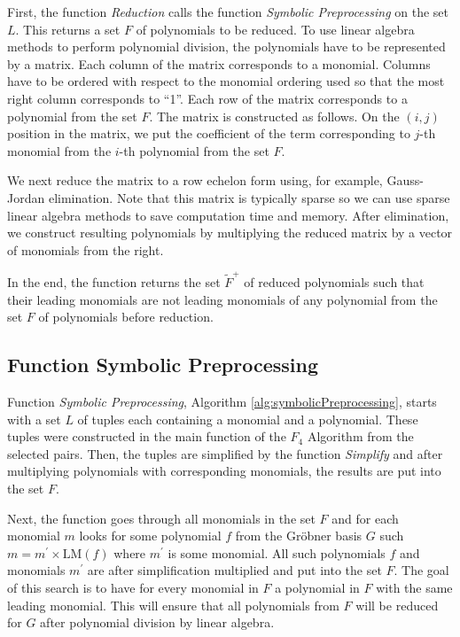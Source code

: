 First, the function \textit{Reduction} calls the function \textit{Symbolic Preprocessing} on the set $L$. This returns a set $F$ of polynomials to be reduced. To use linear algebra methods to perform polynomial division, the polynomials have to be represented by a matrix. Each column of the matrix corresponds to a monomial. Columns have to be ordered with respect to the monomial ordering used so that the most right column corresponds to ``1''. Each row of the matrix corresponds to a polynomial from the set $F$. The matrix is constructed as follows. On the $(i, j)$ position in the matrix, we put the coefficient of the term corresponding to $j$-th monomial from the $i$-th polynomial from the set $F$.

We next reduce the matrix to a row echelon form using, for example, Gauss-Jordan elimination. Note that this matrix is typically sparse so we can use sparse linear algebra methods to save computation time and memory. After elimination, we construct resulting polynomials by multiplying the reduced matrix by a vector of monomials from the right.

In the end, the function returns the set $\tilde{F}^+$ of reduced polynomials such that their leading monomials are not leading monomials of any polynomial from the set $F$ of polynomials before reduction.



\subsection{Function Symbolic Preprocessing}
Function \textit{Symbolic Preprocessing}, Algorithm \ref{alg:symbolicPreprocessing}, starts with a set $L$ of tuples each containing a monomial and a polynomial. These tuples were constructed in the main function of the $F_4$ Algorithm from the selected pairs. Then, the tuples are simplified by the function \textit{Simplify} and after multiplying polynomials with corresponding monomials, the results are put into the set $F$.

Next, the function goes through all monomials in the set $F$ and for each monomial $m$ looks for some polynomial $f$ from the Gr\"obner basis $G$ such $m = m^\prime \times \textrm{LM}(f)$ where $m^\prime$ is some monomial. All such polynomials $f$ and monomials $m^\prime$ are after simplification multiplied and put into the set $F$. The goal of this search is to have for every monomial in $F$ a polynomial in $F$ with the same leading monomial. This will ensure that all polynomials from $F$ will be reduced for $G$ after polynomial division by linear algebra.

